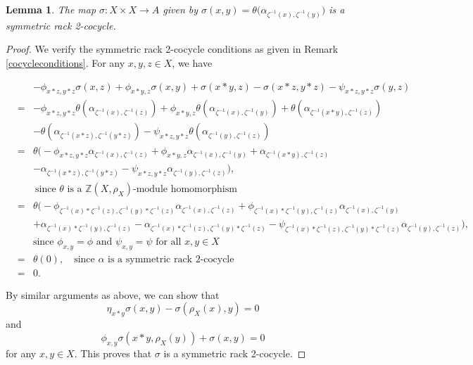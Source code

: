\documentclass[11pt,reqno]{amsart}
\newtheorem{lemma}[theorem]{Lemma}
\theoremstyle{definition}
\numberwithin{equation}{subsection}
\begin{document}
\begin{lemma}
	The map $\sigma: X \times X \longrightarrow A$ given by $\sigma(x, y)=\theta \big(\alpha_{\zeta^{-1}(x), \zeta^{-1}(y)} \big)$ is a symmetric rack 2-cocycle.
\end{lemma}
\begin{proof}
We verify the symmetric rack 2-cocycle conditions as given in Remark \ref{cocycleconditions}. For any $x, y, z \in X$, we have
\begin{small}
\begin{eqnarray*}
			&& -\phi_{x * z, y * z} \sigma(x, z)+\phi_{x * y, z} \sigma(x, y)+\sigma(x * y, z) -\sigma(x * z, y * z)-\psi_{x * z, y * z} \sigma(y, z) \\
			& = &-\phi_{x * z, y * z} \theta(\alpha_{\zeta^{-1}(x), \zeta^{-1}(z)})+\phi_{x * y, z} \theta(\alpha_{\zeta^{-1}(x), \zeta^{-1}(y)}) +\theta(\alpha_{\zeta^{-1}(x * y), \zeta^{-1}(z)}) \\
			&& -\theta(\alpha_{\zeta^{-1}(x * z), \zeta^{-1}(y * z)})  -\psi_{x * z, y * z} \theta(\alpha_{\zeta^{-1}(y), \zeta^{-1}(z)})\\
			& = &\theta \Big(-\phi_{x * z, y * z} \alpha_{\zeta^{-1}(x), \zeta^{-1}(z)} +\phi_{x * y, z} \alpha_{\zeta^{-1}(x), \zeta^{-1}(y)} +\alpha_{\zeta^{-1}(x * y), \zeta^{-1}(z)}\\
			&& -\alpha_{\zeta^{-1}(x * z), \zeta^{-1}(y * z)}-\psi_{x * z, y * z} \alpha_{\zeta^{-1}(y), \zeta^{-1}(z)} \Big),\\
			&& ~\textrm{since $\theta$ is a $\mathbb{Z}(X, \rho_{X})$-module homomorphism}\\
			& = &\theta \Big(-\phi_{\zeta^{-1}(x) * \zeta^{-1}(z), \zeta^{-1}(y) * \zeta^{-1}(z)}  \alpha_{\zeta^{-1}(x) , \zeta^{-1}(z)}  +\phi_{\zeta^{-1}(x) * \zeta^{-1}(y), \zeta^{-1}(z)} \alpha_{\zeta^{-1}(x), \zeta^{-1}(y)}  \\
			&& +\alpha_{\zeta^{-1}(x) * \zeta^{-1}(y), \zeta^{-1}(z)} -\alpha_{\zeta^{-1}(x) * \zeta^{-1}(z), \zeta^{-1}(y) * \zeta^{-1}(z)}  -\psi_{\zeta^{-1}(x) * \zeta^{-1}(z), \zeta^{-1}(y) * \zeta^{-1}(z)} \alpha _{\zeta^{-1}(y), \zeta^{-1}(z)} \Big),\\
& & \text{since $\phi_{x, y}=\phi$ and $\psi_{x, y}=\psi$ for all $x, y \in X$}\\
& = &\theta(0), \quad \text{since $\alpha$ is a symmetric rack 2-cocycle}\\
&=& 0.
\end{eqnarray*}	
\end{small}
By similar arguments as above, we can show that
$$ \eta_{x *y} \sigma(x, y)-\sigma(\rho_{X}(x), y)=0$$
and 
$$\phi_{x, y} \sigma(x * y, \rho_{X}(y))+\sigma(x, y)=0$$
 for any $x, y \in X$. This proves that $\sigma$ is a symmetric rack 2-cocycle.
\end{proof}
\end{document}
